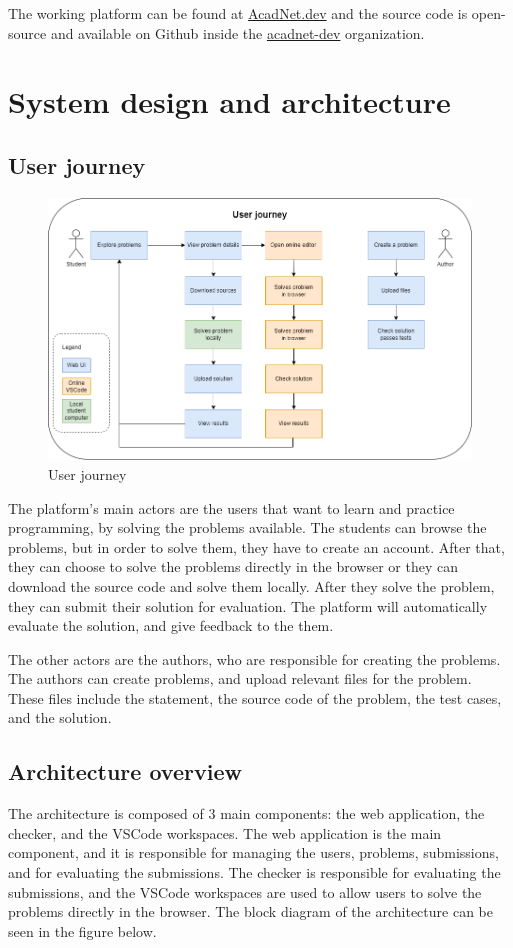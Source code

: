 \documentclass[12pt,a4paper]{report}
\begin{document}
The working platform can be found at \href{https://acadnet.dev}{AcadNet.dev} and the source code is open-source and available on Github inside the \href{https://github.com/acadnet-dev}{acadnet-dev} organization.


\chapter{System design and architecture}
\section{User journey}
\begin{figure}[h]
	\centering
	\includegraphics[width=\linewidth]{../photos/user-journey.png}
	\caption{User journey}
	\label{fig:user-journey}
\end{figure}

The platform's main actors are the users that want to learn and practice programming, by solving the problems available. The students can browse the problems, but in order to solve them, they have to create an account. After that, they can choose to solve the problems directly in the browser or they can download the source code and solve them locally. After they solve the problem, they can submit their solution for evaluation. The platform will automatically evaluate the solution, and give feedback to the them.

The other actors are the authors, who are responsible for creating the problems. The authors can create problems, and upload relevant files for the problem. These files include the statement, the source code of the problem, the test cases, and the solution.

\section{Architecture overview}
The architecture is composed of 3 main components: the web application, the checker, and the VSCode workspaces. The web application is the main component, and it is responsible for managing the users, problems, submissions, and for evaluating the submissions. The checker is responsible for evaluating the submissions, and the VSCode workspaces are used to allow users to solve the problems directly in the browser. The block diagram of the architecture can be seen in the figure below.
\end{document}
